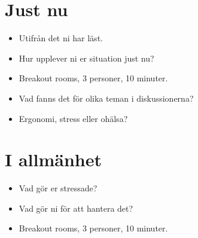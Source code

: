 \mode*

\section{Just nu}

\begin{frame}
  \begin{question}[Situationen ju nu]
    \begin{itemize}
      \item Utifrån det ni har läst.
      \item Hur upplever ni er situation just nu?
    \end{itemize}
  \end{question}

  \begin{exercise}
    \begin{itemize}
      \item Breakout rooms, 3 personer, 10 minuter.
    \end{itemize}
  \end{exercise}
\end{frame}

\begin{frame}
  \begin{question}
    \begin{itemize}
      \item Vad fanns det för olika teman i diskussionerna?
      \item Ergonomi, stress eller ohälsa?
    \end{itemize}
  \end{question}
\end{frame}


\section{I allmänhet}

\begin{frame}
  \begin{question}
    \begin{itemize}
      \item Vad gör er stressade?
      \item Vad gör ni för att hantera det?
    \end{itemize}
  \end{question}

  \begin{exercise}
    \begin{itemize}
      \item Breakout rooms, 3 personer, 10 minuter.
    \end{itemize}
  \end{exercise}
\end{frame}



